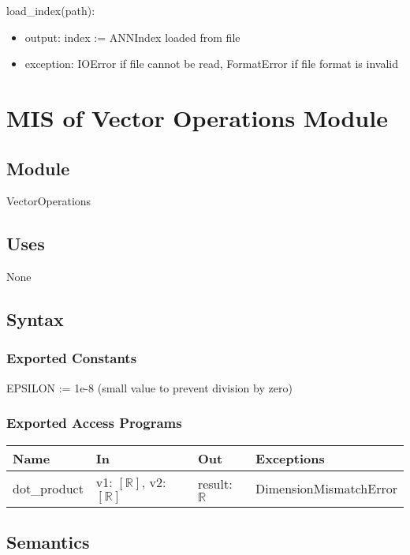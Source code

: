 \documentclass[12pt, titlepage]{article}
\begin{document}
\noindent load\_index(path):
\begin{itemize}
  \item output: index := ANNIndex loaded from file
  \item exception: IOError if file cannot be read, FormatError if file format is invalid
\end{itemize}

\section{MIS of Vector Operations Module} \label{ModuleVO}

\subsection{Module}

VectorOperations

\subsection{Uses}
None

\subsection{Syntax}

\subsubsection{Exported Constants}
EPSILON := 1e-8 (small value to prevent division by zero)
\subsubsection{Exported Access Programs}

\begin{center}
\begin{tabular}{p{2cm} p{4cm} p{4cm} p{4cm}}
\hline
\textbf{Name} & \textbf{In} & \textbf{Out} & \textbf{Exceptions} \\
\hline
dot\_product & v1: $[\mathbb{R}]$, v2: $[\mathbb{R}]$ & result: $\mathbb{R}$ & DimensionMismatchError \\

\hline
\end{tabular}
\end{center}

\subsection{Semantics}
\end{document}
